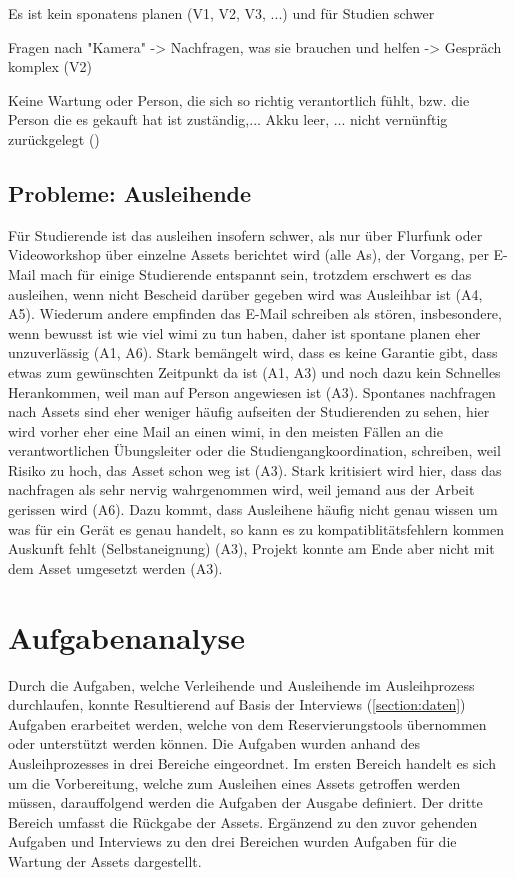Es ist kein sponatens planen (V1, V2, V3, ...) und für Studien schwer

Fragen nach "Kamera" -> Nachfragen, was sie brauchen und helfen -> Gespräch komplex (V2) 

Keine Wartung oder Person, die sich so richtig verantortlich fühlt, bzw. die Person die es gekauft
hat ist zuständig,... Akku leer, ... nicht vernünftig zurückgelegt ()

\subsection*{Probleme: Ausleihende}
Für Studierende ist das ausleihen insofern schwer, als nur über Flurfunk oder Videoworkshop
über einzelne Assets berichtet wird (alle As), der Vorgang, per E-Mail mach für einige Studierende
entspannt sein, trotzdem erschwert es das ausleihen, wenn nicht Bescheid darüber gegeben wird was
Ausleihbar ist (A4, A5). Wiederum andere empfinden das E-Mail schreiben als stören, insbesondere,
wenn bewusst ist wie viel \ac{wimi} zu tun haben, daher ist spontane planen eher unzuverlässig (A1,
A6). Stark bemängelt wird, dass es keine Garantie gibt, dass etwas zum gewünschten Zeitpunkt da ist
(A1, A3) und noch dazu kein Schnelles Herankommen, weil man auf Person angewiesen ist (A3). Spontanes
nachfragen nach Assets sind eher weniger häufig aufseiten der Studierenden zu sehen, hier wird
vorher eher eine Mail an einen \ac{wimi}, in den meisten Fällen an die verantwortlichen Übungsleiter
oder die Studiengangkoordination, schreiben, weil Risiko zu hoch, das Asset schon weg ist (A3).
Stark kritisiert wird hier, dass das nachfragen als sehr nervig wahrgenommen wird, weil jemand aus
der Arbeit gerissen wird (A6). Dazu kommt, dass Ausleihene häufig nicht genau wissen um was für ein
Gerät es genau handelt, so kann es zu kompatiblitätsfehlern kommen Auskunft fehlt (Selbstaneignung)
(A3), Projekt konnte am Ende aber nicht mit dem Asset umgesetzt werden (A3). 


\section{Aufgabenanalyse}
\label{section:aufgaben}
Durch die Aufgaben, welche Verleihende und Ausleihende im Ausleihprozess durchlaufen, konnte
Resultierend auf Basis der Interviews (\ref{section:daten}) Aufgaben erarbeitet werden, welche von
dem Reservierungstools übernommen oder unterstützt werden können. Die Aufgaben wurden anhand des
Ausleihprozesses in drei Bereiche eingeordnet. Im ersten Bereich handelt es sich um die
Vorbereitung, welche zum Ausleihen eines Assets getroffen werden müssen, darauffolgend werden die
Aufgaben der Ausgabe definiert. Der dritte Bereich umfasst die Rückgabe der Assets. Ergänzend zu den
zuvor gehenden Aufgaben und Interviews zu den drei Bereichen wurden Aufgaben für die Wartung der
Assets dargestellt.

